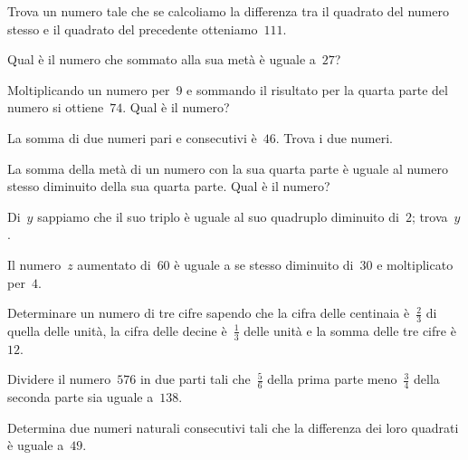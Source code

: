\begin{multicols}{2}
\begin{esercizio}[\Ast]
\label{ese:16.29}
Trova un numero tale che se calcoliamo la differenza tra il quadrato del numero stesso e il quadrato del precedente otteniamo~$111$.
\end{esercizio}

\begin{esercizio}
\label{ese:16.30}
Qual è il numero che sommato alla sua metà è uguale a~$27$?
\end{esercizio}

\begin{esercizio}[\Ast]
\label{ese:16.31}
Moltiplicando un numero per~9 e sommando il risultato per la quarta parte del numero si ottiene~$74$. Qual è il numero?
\end{esercizio}

\begin{esercizio}
\label{ese:16.32}
La somma di due numeri pari e consecutivi è~$46$. Trova i due numeri.
\end{esercizio}

\begin{esercizio}[\Ast]
\label{ese:16.33}
La somma della metà di un numero con la sua quarta parte è uguale al numero stesso diminuito della sua quarta parte. Qual è il numero?
\end{esercizio}

\begin{esercizio}[\Ast]
\label{ese:16.34}
Di~$y$ sappiamo che il suo triplo è uguale al suo quadruplo diminuito di~$2$; trova~$y$.
\end{esercizio}

\begin{esercizio}
\label{ese:16.35}
Il numero~$z$ aumentato di~$60$ è uguale a se stesso diminuito di~$30$ e moltiplicato per~$4$.
\end{esercizio}

\begin{esercizio}[\Ast]
\label{ese:16.36}
Determinare un numero di tre cifre sapendo che la cifra delle centinaia è~$\frac{2}{3}$ di quella delle unità, la cifra delle decine è~$\frac{1}{3}$ delle unità e la somma delle tre cifre è~$12$.
\end{esercizio}

\begin{esercizio}[\Ast]
\label{ese:16.37}
Dividere il numero~$576$ in due parti tali che~$\frac{5}{6}$ della prima parte meno~$\frac{3}{4}$ della seconda parte sia uguale a~$138$.
\end{esercizio}

\begin{esercizio}[\Ast]
\label{ese:16.38}
Determina due numeri naturali consecutivi tali che la differenza dei loro quadrati è uguale a~$49$.
\end{esercizio}
\end{multicols}

